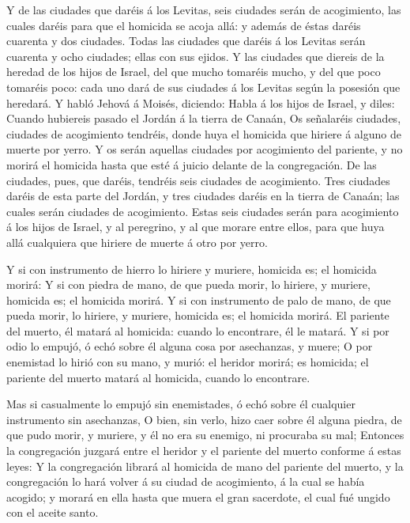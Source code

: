  Y de las ciudades que daréis á los Levitas, seis ciudades
serán de acogimiento, las cuales daréis para que el homicida se acoja
allá: y además de éstas daréis cuarenta y dos ciudades. 
Todas las ciudades que daréis á los Levitas serán cuarenta y ocho
ciudades; ellas con sus ejidos.  Y las ciudades que diereis
de la heredad de los hijos de Israel, del que mucho tomaréis mucho, y
del que poco tomaréis poco: cada uno dará de sus ciudades á los Levitas
según la posesión que heredará.  Y habló Jehová á Moisés,
diciendo:  Habla á los hijos de Israel, y diles: Cuando
hubiereis pasado el Jordán á la tierra de Canaán,  Os
señalaréis ciudades, ciudades de acogimiento tendréis, donde huya el
homicida que hiriere á alguno de muerte por yerro.  Y os
serán aquellas ciudades por acogimiento del pariente, y no morirá el
homicida hasta que esté á juicio delante de la congregación.
 De las ciudades, pues, que daréis, tendréis seis ciudades
de acogimiento.  Tres ciudades daréis de esta parte del
Jordán, y tres ciudades daréis en la tierra de Canaán; las cuales serán
ciudades de acogimiento.  Estas seis ciudades serán para
acogimiento á los hijos de Israel, y al peregrino, y al que morare entre
ellos, para que huya allá cualquiera que hiriere de muerte á otro por
yerro.

 Y si con instrumento de hierro lo hiriere y muriere,
homicida es; el homicida morirá:  Y si con piedra de mano,
de que pueda morir, lo hiriere, y muriere, homicida es; el homicida
morirá.  Y si con instrumento de palo de mano, de que pueda
morir, lo hiriere, y muriere, homicida es; el homicida morirá.
 El pariente del muerto, él matará al homicida: cuando lo
encontrare, él le matará.  Y si por odio lo empujó, ó echó
sobre él alguna cosa por asechanzas, y muere;  O por
enemistad lo hirió con su mano, y murió: el heridor morirá; es homicida;
el pariente del muerto matará al homicida, cuando lo encontrare.

 Mas si casualmente lo empujó sin enemistades, ó echó sobre
él cualquier instrumento sin asechanzas,  O bien, sin
verlo, hizo caer sobre él alguna piedra, de que pudo morir, y muriere, y
él no era su enemigo, ni procuraba su mal;  Entonces la
congregación juzgará entre el heridor y el pariente del muerto conforme
á estas leyes:  Y la congregación librará al homicida de
mano del pariente del muerto, y la congregación lo hará volver á su
ciudad de acogimiento, á la cual se había acogido; y morará en ella
hasta que muera el gran sacerdote, el cual fué ungido con el aceite
santo.

